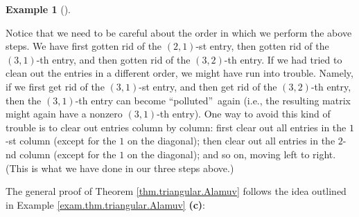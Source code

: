 \documentclass[numbers=enddot,12pt,final,onecolumn,notitlepage]{scrartcl}%
\theoremstyle{definition}
\newtheorem{exam}[theo]{Example}
\newenvironment{example}[1][]
{\begin{exam}[#1]\begin{leftbar}}
{\end{leftbar}\end{exam}}
\begin{document}
\begin{example}
Notice that we need to be careful about the order in which we perform the
above steps. We have first gotten rid of the $\left(  2,1\right)  $-st entry,
then gotten rid of the $\left(  3,1\right)  $-th entry, and then gotten rid of
the $\left(  3,2\right)  $-th entry. If we had tried to clean out the entries
in a different order, we might have run into trouble. Namely, if we first get
rid of the $\left(  3,1\right)  $-st entry, and then get rid of the $\left(
3,2\right)  $-th entry, then the $\left(  3,1\right)  $-th entry can become
\textquotedblleft polluted\textquotedblright\ again (i.e., the resulting
matrix might again have a nonzero $\left(  3,1\right)  $-th entry). One way to
avoid this kind of trouble is to clear out entries column by column: first
clear out all entries in the $1$-st column (except for the $1$ on the
diagonal); then clear out all entries in the $2$-nd column (except for the $1$
on the diagonal); and so on, moving left to right. (This is what we have done
in our three steps above.)
\end{example}

The general proof of Theorem \ref{thm.triangular.Alamuv} follows the idea
outlined in Example \ref{exam.thm.triangular.Alamuv} \textbf{(c)}:
\end{document}
